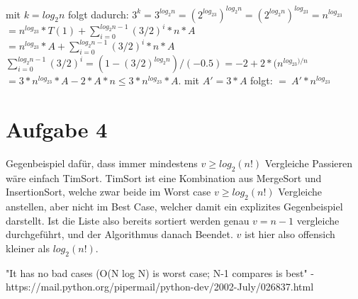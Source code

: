 \documentclass{scrartcl}
\begin{document}
mit $k = log_2n$ folgt dadurch:
$3^k = 3^{log_2n} = (2^{log_23})^{log_2n} = (2^{log_2n})^{log_23} = n^{log_23} $ \\
$ = n^{log_23}*T(1) + \sum_{i=0}^{log_2{n-1}}{(3/2)^i * n * A}$ 
$ = n^{log_23}*A + \sum_{i=0}^{log_2{n-1}}{(3/2)^i * n * A}$ \\
$ \sum_{i=0}^{log_2{n-1}}{(3/2)^i} = (1 - (3/2)^{log_2n})/(-0.5) = -2 + 2 * (n^{log_23)/n} $ \\
$ = 3 * n^{log_23} * A - 2 * A * n \leq 3 * n^{log_23} * A$.
mit $ A' = 3 * A$ folgt: $=\> A' * n^{log_23}$



\section*{Aufgabe 4}

Gegenbeispiel dafür, dass immer mindestens $v \geq log_2(n!)$ Vergleiche Passieren
wäre einfach TimSort. TimSort ist eine Kombination aus MergeSort und InsertionSort,
welche zwar beide im Worst case $v \geq log_2(n!)$ Vergleiche anstellen, aber nicht
im Best Case, welcher damit ein explizites Gegenbeispiel darstellt.
Ist die Liste also bereits sortiert werden genau $v = n - 1$ vergleiche
durchgeführt, und der Algorithmus danach Beendet.
$v$ ist hier also offensich kleiner als $log_2(n!)$.


"It has no bad cases (O(N log N) is worst case; N-1 compares is best" -
https://mail.python.org/pipermail/python-dev/2002-July/026837.html
\end{document}

